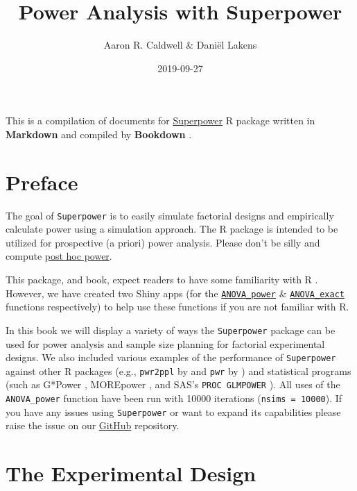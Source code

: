 \documentclass[]{book}
\title{Power Analysis with Superpower}
\author{Aaron R. Caldwell \& Daniël Lakens}
\date{2019-09-27}
\begin{document}
\maketitle

{
\setcounter{tocdepth}{1}
\tableofcontents
}
This is a compilation of documents for \href{https://github.com/arcaldwell49/Superpower}{Superpower} R package written in \textbf{Markdown} \citep{R-rmarkdown} and compiled by \textbf{Bookdown} \citep{R-bookdown}.

\hypertarget{preface}{%
\chapter*{Preface}\label{preface}}

The goal of \texttt{Superpower} is to easily simulate factorial designs and empirically calculate power using a simulation approach.
The R package is intended to be utilized for prospective (a priori) power analysis. Please don't be silly and compute \href{https://discourse.datamethods.org/t/reference-collection-to-push-back-against-common-statistical-myths/1787}{post hoc power}.

This package, and book, expect readers to have some familiarity with R \citeyearpar{R-base}. However, we have created two Shiny apps (for the \href{http://shiny.ieis.tue.nl/anova_power/}{\texttt{ANOVA\_power}} \& \href{http://shiny.ieis.tue.nl/anova_exact/}{\texttt{ANOVA\_exact}} functions respectively) to help use these functions if you are not familiar with R.

In this book we will display a variety of ways the \texttt{Superpower} package can be used for power analysis and sample size planning for factorial experimental designs. We also included various examples of the performance of \texttt{Superpower} against other R packages (e.g., \texttt{pwr2ppl} by \citet{R-pwr2ppl} and \texttt{pwr} by \citet{R-pwr}) and statistical programs (such as G*Power \citet{faul2007g}, MOREpower \citet{Campbell2012MorePower6F}, and SAS's \texttt{PROC\ GLMPOWER} \citeyearpar{SASglmpower}). All uses of the \texttt{ANOVA\_power} function have been run with 10000 iterations (\texttt{nsims\ =\ 10000}). If you have any issues using \texttt{Superpower} or want to expand its capabilities please raise the issue on our \href{https://github.com/arcaldwell49/Superpower/issues}{GitHub} repository.

\hypertarget{the-experimental-design}{%
\chapter{The Experimental Design}\label{the-experimental-design}}
\end{document}

